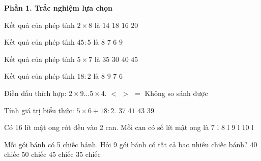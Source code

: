 \textbf{Phần 1. Trắc nghiệm lựa chọn}

\begin{ex} %
Kết quả của phép tính $2 \times 8$ là
\choice
{$14$}
{$18$}
{\True $16$}
{$20$}
\end{ex}

\begin{ex} %
Kết quả của phép tính $45 : 5$ là
\choice
{$8$}
{$7$}
{$6$}
{\True $9$}
\end{ex}

\begin{ex} %
Kết quả của phép tính $5 \times 7$ là
\choice
{\True $35$}
{$30$}
{$40$}
{$45$}
\end{ex}

\begin{ex} %
Kết quả của phép tính $18 : 2$ là
\choice
{$8$}
{\True $9$}
{$7$}
{$6$}
\end{ex}

\begin{ex} %
Điền dấu thích hợp: $2 \times 9 \dots 5 \times 4$.
\choice
{\True $<$}
{$>$}
{$=$}
{Không so sánh được}
\end{ex}

\begin{ex} %
Tính giá trị biểu thức: $5 \times 6 + 18 : 2$.
\choice
{$37$}
{$41$}
{$43$}
{\True $39$}
\end{ex}

\begin{ex} %
Có 16 lít mật ong rót đều vào 2 can. Mỗi can có số lít mật ong là
\choice
{$7\text{ l}$}
{\True $8\text{ l}$}
{$9\text{ l}$}
{$10\text{ l}$}
\end{ex}

\begin{ex} %
Mỗi gói bánh có 5 chiếc bánh. Hỏi 9 gói bánh có tất cả bao nhiêu chiếc bánh?
\choice
{$40$ chiếc}
{$50$ chiếc}
{\True $45$ chiếc}
{$35$ chiếc}
\end{ex}

